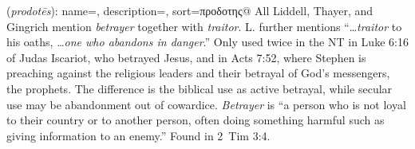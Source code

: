 \item[Betrayer,]

(\textit{prodotēs}):
{
    name=,
    description={},
    sort=προδοτης@
}
All Liddell, Thayer, and Gingrich mention \emph{betrayer} together with \emph{traitor}. 
L. further mentions ``\ldots \emph{traitor} to his oaths, \ldots \emph{one who abandons in danger}.''
Only used twice in the NT in Luke 6:16 of Judas Iscariot, who betrayed Jesus, and in Acts 7:52, where Stephen is preaching against the religious leaders and their betrayal of God’s messengers, the prophets. The difference is the biblical use as active betrayal, while secular use may be abandonment out of cowardice.
\emph{Betrayer} is ``a person who is not loyal to their country or to another person, often doing something harmful such as giving information to an enemy.''
Found in 2~Tim 3:4.
